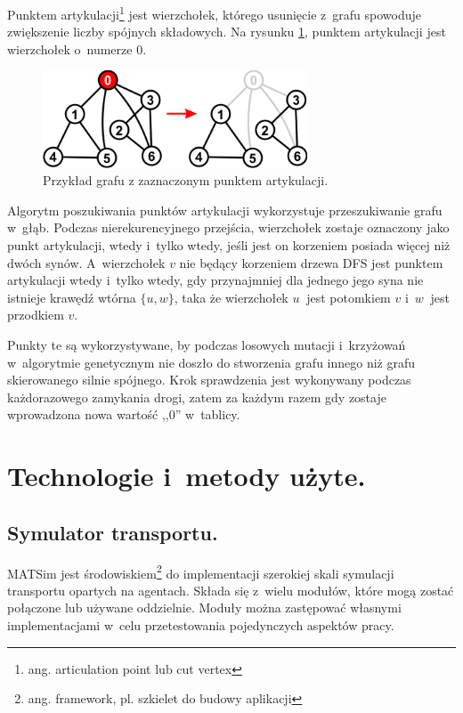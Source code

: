 \documentclass[twoside,12pt]{report}
\let\oldsection\chapter
\def\chapter{\cleardoublepage\oldsection}
\begin{document}
Punktem artykulacji\footnote{ang. articulation point lub cut vertex} jest wierzchołek, którego usunięcie z~grafu spowoduje zwiększenie liczby spójnych składowych. Na rysunku \ref{artykulacja}, punktem artykulacji jest wierzchołek o~numerze $0$.

\begin{figure}[h]
\begin{center}
\includegraphics[width=0.7\textwidth]{img/articulation}
\caption{Przykład grafu z zaznaczonym punktem artykulacji.}
\label{artykulacja}
\end{center}
\end{figure}

Algorytm poszukiwania punktów artykulacji wykorzystuje przeszukiwanie grafu w~głąb. Podczas nierekurencyjnego przejścia, wierzchołek zostaje oznaczony jako punkt artykulacji, wtedy i~tylko wtedy, jeśli jest on korzeniem posiada więcej niż dwóch synów. A~wierzchołek $ v $ nie będący korzeniem drzewa DFS jest punktem artykulacji wtedy i~tylko wtedy, gdy przynajmniej dla jednego jego syna nie istnieje krawędź wtórna $ \{u,w\} $, taka że wierzchołek $ u~$ jest potomkiem $ v $ i~$ w~$ jest przodkiem $ v $.

Punkty te są wykorzystywane, by podczas losowych mutacji i~krzyżowań w~algorytmie genetycznym nie doszło do stworzenia grafu innego niż grafu skierowanego silnie spójnego. Krok sprawdzenia jest wykonywany podczas każdorazowego zamykania drogi, zatem za każdym razem gdy zostaje wprowadzona nowa wartość ,,$0$'' w~tablicy.

\chapter{Technologie i~metody użyte.}\label{rozdz.technologie} 
\section{Symulator transportu.}

MATSim jest środowiskiem\footnote{ang. framework, pl. szkielet do budowy aplikacji} do implementacji szerokiej skali symulacji transportu opartych na agentach. Składa się z~wielu modułów, które mogą zostać połączone lub używane oddzielnie. Moduły można zastępować własnymi implementacjami w~celu przetestowania pojedynczych aspektów pracy\cite{matsim}.
\end{document}
